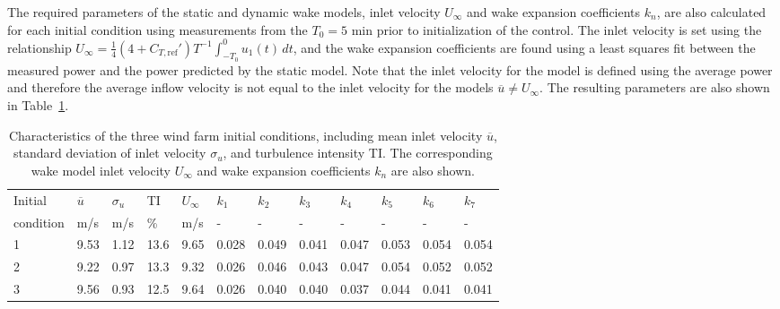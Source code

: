 The required parameters of the static and dynamic wake models, inlet velocity $U_\infty$ and wake expansion coefficients $k_n$, are also calculated for each initial condition using measurements from the $T_0 = 5$ min prior to initialization of the control. The inlet velocity is set using the relationship $U_\infty =\frac{1}{4}(4 + C_{T,\text{ref}}')T^{-1}\int_{-T_0}^0 u_1(t) \, dt$, and the wake expansion coefficients are found using a least squares fit between the measured power and the power predicted by the static model. Note that the inlet velocity for the model is defined using the average power and therefore  the average inflow velocity is not equal to the inlet velocity for the models $\overline{u} \ne U_\infty$. The resulting parameters are also shown in Table~\ref{tab:params}.
%
\begin{center}
\begin{table}[h!]
\caption{\label{tab:params} Characteristics of the three wind farm initial conditions, including mean inlet velocity $\overline{u}$, standard deviation of inlet velocity $\sigma_u$, and turbulence intensity TI. The corresponding wake model inlet velocity $U_\infty$ and wake expansion coefficients $k_n$ are also shown.}
\centering
\begin{tabular}{@{}*{12}{l}}
\hline
Initial & $\overline{u}$ & $\sigma_u$& TI & $U_\infty$& $k_1$ & $k_2$ & $k_3$ & $k_4$ & $k_5$ & $k_6$ & $k_7$\\
condition & m/s & m/s & \% &  m/s & - & - & - & - & - & - & - \\
\hline
1 & 9.53 & 1.12 & 13.6 & 9.65 & 0.028 & 0.049 & 0.041 & 0.047 & 0.053 & 0.054 & 0.054 \\
2 & 9.22 & 0.97 & 13.3 & 9.32 & 0.026 & 0.046 & 0.043 & 0.047 & 0.054 & 0.052 & 0.052 \\
3 & 9.56 & 0.93 & 12.5 & 9.64 & 0.026 & 0.040 & 0.040 & 0.037 & 0.044 & 0.041 & 0.041 \\
\hline
\end{tabular}
\end{table}
\end{center}


